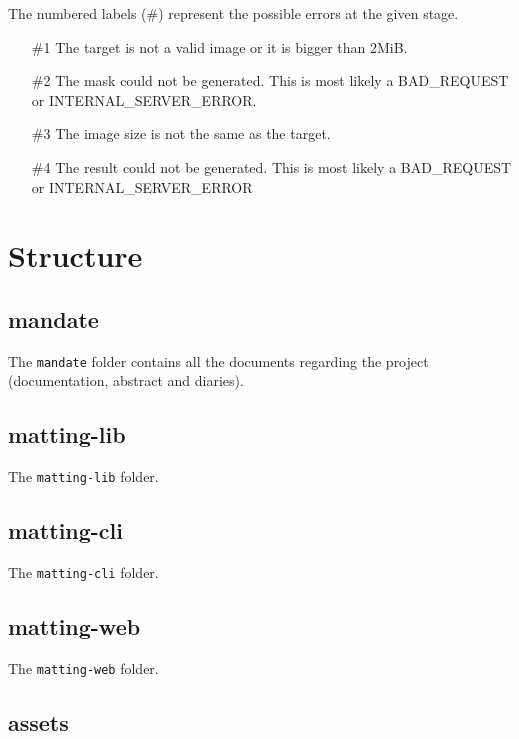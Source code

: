 \documentclass[a4paper]{article}
\begin{document}
The numbered labels (\#) represent the possible errors at the given stage.

\begin{itemize}
    \item[\#1] The target is not a valid image or it is bigger than 2MiB.
    \item[\#2] The mask could not be generated.
        This is most likely a \textsc{BAD\_REQUEST}
        or \textsc{INTERNAL\_SERVER\_ERROR}.
    \item[\#3] The image size is not the same as the target.
    \item[\#4] The result could not be generated.
        This is most likely a \textsc{BAD\_REQUEST}
        or \textsc{INTERNAL\_SERVER\_ERROR}
\end{itemize}

\pagebreak

\section{Structure}

\subsection{mandate}

The \texttt{mandate} folder contains all the documents regarding
the project (documentation, abstract and diaries).

\subsection{matting-lib}

The \texttt{matting-lib} folder.

\subsection{matting-cli}

The \texttt{matting-cli} folder.

\subsection{matting-web}

The \texttt{matting-web} folder.

\subsection{assets}
\end{document}
